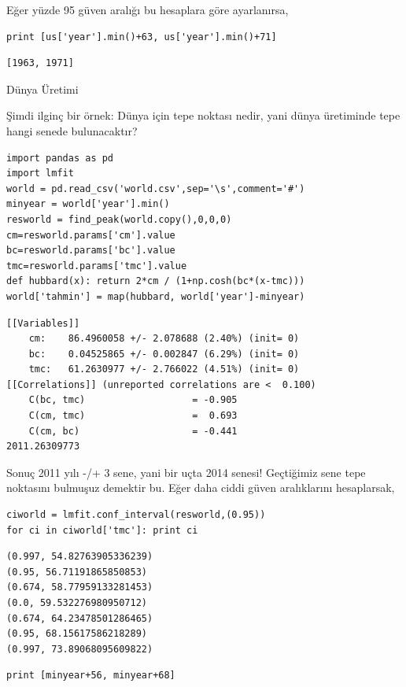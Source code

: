 \documentclass[12pt,fleqn]{article}\usepackage{../../common}
\begin{document}
Eğer yüzde 95 güven aralığı bu hesaplara göre ayarlanırsa, 

\begin{verbatim}
print [us['year'].min()+63, us['year'].min()+71]
\end{verbatim}

\begin{verbatim}
[1963, 1971]
\end{verbatim}

Dünya Üretimi

Şimdi ilginç bir örnek: Dünya için tepe noktası nedir, yani dünya üretiminde
tepe hangi senede bulunacaktır?

\begin{verbatim}
import pandas as pd
import lmfit
world = pd.read_csv('world.csv',sep='\s',comment='#')
minyear = world['year'].min()
resworld = find_peak(world.copy(),0,0,0)
cm=resworld.params['cm'].value
bc=resworld.params['bc'].value
tmc=resworld.params['tmc'].value
def hubbard(x): return 2*cm / (1+np.cosh(bc*(x-tmc))) 
world['tahmin'] = map(hubbard, world['year']-minyear)
\end{verbatim}

\begin{verbatim}
[[Variables]]
    cm:    86.4960058 +/- 2.078688 (2.40%) (init= 0)
    bc:    0.04525865 +/- 0.002847 (6.29%) (init= 0)
    tmc:   61.2630977 +/- 2.766022 (4.51%) (init= 0)
[[Correlations]] (unreported correlations are <  0.100)
    C(bc, tmc)                   = -0.905 
    C(cm, tmc)                   =  0.693 
    C(cm, bc)                    = -0.441 
2011.26309773
\end{verbatim}

Sonuç 2011 yılı -/+ 3 sene, yani bir uçta 2014 senesi! Geçtiğimiz sene tepe
noktasını bulmuşuz demektir bu. Eğer daha ciddi güven aralıklarını
hesaplarsak,

\begin{verbatim}
ciworld = lmfit.conf_interval(resworld,(0.95))
for ci in ciworld['tmc']: print ci
\end{verbatim}

\begin{verbatim}
(0.997, 54.82763905336239)
(0.95, 56.71191865850853)
(0.674, 58.77959133281453)
(0.0, 59.532276980950712)
(0.674, 64.23478501286465)
(0.95, 68.15617586218289)
(0.997, 73.89068095609822)
\end{verbatim}

\begin{verbatim}
print [minyear+56, minyear+68]
\end{verbatim}
\end{document}
